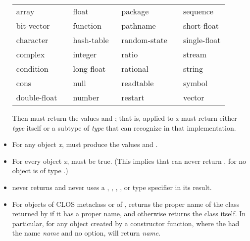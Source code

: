 \begin{defun}[Function]
\begin{new}
\begin{itemize}
\begin{flushleft}
\cf
\begin{tabular}{@{}llll@{}}
array          & float        & package        & sequence \\
bit-vector     & function     & pathname       & short-float \\
character      & hash-table   & random-state~~ & single-float \\
complex        & integer      & ratio          & stream \\
condition      & long-float~~ & rational       & string \\
cons           & null         & readtable      & symbol \\
double-float~~ & number       & restart        & vector
\end{tabular}
\end{flushleft}

Then
must return the values  and ; that is,  applied
to {\it x} must return either {\it type} itself or a subtype of {\it type}
that  can recognize in that implementation.

\item
For any object {\it x}, 
must produce the values  and .

\item
For every object {\it x}, 
must be true.  (This implies that  can never return ,
for no object is of type .)

\item
{} never returns  and never uses
a , , , ,
or  type specifier in its result.

\item
For objects of CLOS metaclass  or of ,
 returns the proper name of the class returned by 
if it has a proper name, and otherwise returns the class itself.
In particular,
for any object created by a  constructor function,
where the  had the name {\it name} and no  option,
 will return {\it name}.
\end{itemize}


\end{new}
\end{defun}

